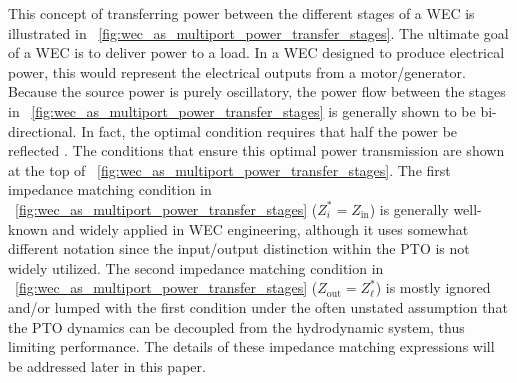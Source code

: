 \documentclass[lettersize,journal]{IEEEtran}
\begin{document}
This concept of transferring power between the different stages of a WEC is illustrated in  \figurename~\ref{fig:wec_as_multiport_power_transfer_stages}.
The ultimate goal of a WEC is to deliver power to a load. 
In a WEC designed to produce electrical power, this would represent the electrical outputs from a motor/generator. 
Because the source power is purely oscillatory, the power flow between the stages in \figurename~\ref{fig:wec_as_multiport_power_transfer_stages} is generally shown to be bi-directional. 
In fact, the optimal condition requires that half the power be reflected \cite{Evans1976}. 
The conditions that ensure this optimal power transmission are shown at the top of \figurename~\ref{fig:wec_as_multiport_power_transfer_stages}.
The first impedance matching condition in \figurename~\ref{fig:wec_as_multiport_power_transfer_stages} ($Z_i^* = Z_{\textrm{in}}$) is generally well-known and widely applied in WEC engineering, although it uses somewhat different notation since the input/output distinction within the PTO is not widely utilized. 
The second impedance matching condition in \figurename~\ref{fig:wec_as_multiport_power_transfer_stages} ($Z_{\textrm{out}} = Z_\ell^*$) is mostly ignored and/or lumped with the first condition under the often unstated assumption that the PTO dynamics can be decoupled from the hydrodynamic system, thus limiting performance. 
The details of these impedance matching expressions will be addressed later in this paper.
\end{document}
